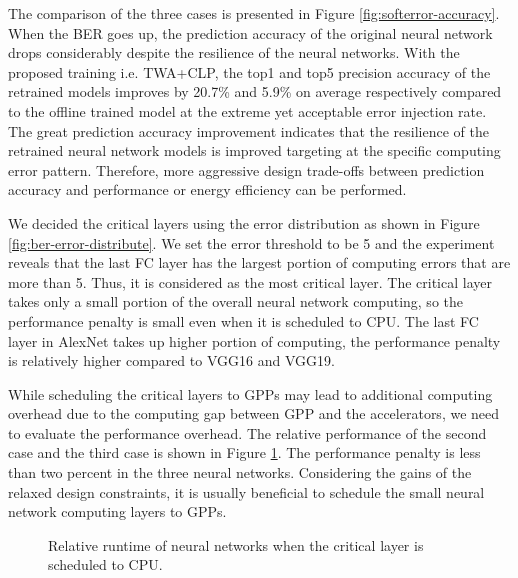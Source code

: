 The comparison of the three cases is presented in Figure \ref{fig:softerror-accuracy}.
When the BER goes up, the prediction accuracy of the original neural network drops 
considerably despite the resilience of the neural networks. 
With the proposed training i.e. TWA+CLP, the top1 and top5 precision accuracy 
of the retrained models improves by 20.7\% and 5.9\% on average respectively 
compared to the offline trained model at the extreme yet acceptable error injection rate. 
The great prediction accuracy improvement indicates that the resilience 
of the retrained neural network models is improved targeting at the 
specific computing error pattern. Therefore, more aggressive design trade-offs 
between prediction accuracy and performance or energy efficiency can be performed. 

\begin{figure*}
        \caption{Error distribution across the neural network layers when highest BER is used in AlexNet, VGG16 and VGG19.}
        \label{fig:ber-error-distribute}
	\vspace{-1em}
\end{figure*}

We decided the critical layers using the error distribution as shown in Figure \ref{fig:ber-error-distribute}.
We set the error threshold to be 5 and the experiment reveals that the last FC 
layer has the largest portion of computing errors that are more than 5. Thus, it is considered as 
the most critical layer. The critical layer takes only a small portion of the overall 
neural network computing, so the performance penalty is small even 
when it is scheduled to CPU. The last FC layer in AlexNet takes up higher portion of computing, 
the performance penalty is relatively higher compared to VGG16 and VGG19.

While scheduling the critical layers to GPPs may lead to additional computing overhead
due to the computing gap between GPP and the accelerators, we need to evaluate the
performance overhead. The relative performance of the second case and the third case
is shown in Figure \ref{fig:clp_perf}. The performance penalty is less than two percent
in the three neural networks. Considering the gains of the relaxed design constraints,
it is usually beneficial to schedule the small neural network computing layers to GPPs.
\begin{figure}
        \caption{Relative runtime of neural networks when the critical layer is scheduled to CPU.}
        \label{fig:clp_perf}
\end{figure}
